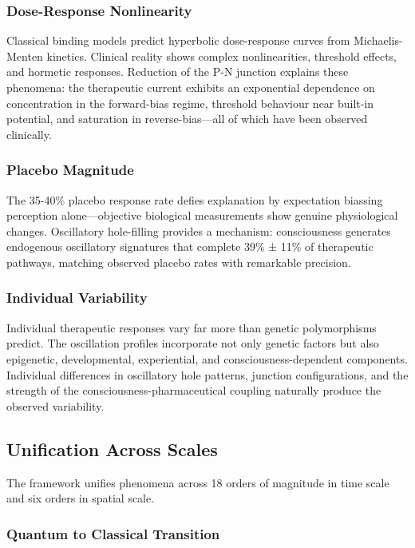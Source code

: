\documentclass{article}
\theoremstyle{definition}
\theoremstyle{remark}
\begin{document}
\subsubsection{Dose-Response Nonlinearity}

Classical binding models predict hyperbolic dose-response curves from Michaelis-Menten kinetics. Clinical reality shows complex nonlinearities, threshold effects, and hormetic responses. Reduction of the P-N junction explains these phenomena: the therapeutic current exhibits an exponential dependence on concentration in the forward-bias regime, threshold behaviour near built-in potential, and saturation in reverse-bias—all of which have been observed clinically.

\subsubsection{Placebo Magnitude}

The 35-40\% placebo response rate\cite{Benedetti2008} defies explanation by expectation biassing perception alone—objective biological measurements show genuine physiological changes. Oscillatory hole-filling provides a mechanism: consciousness generates endogenous oscillatory signatures that complete 39\% ± 11\% of therapeutic pathways, matching observed placebo rates with remarkable precision.

\subsubsection{Individual Variability}

Individual therapeutic responses vary far more than genetic polymorphisms predict. The oscillation profiles incorporate not only genetic factors but also epigenetic, developmental, experiential, and consciousness-dependent components. Individual differences in oscillatory hole patterns, junction configurations, and the strength of the consciousness-pharmaceutical coupling naturally produce the observed variability.

\subsection{Unification Across Scales}

The framework unifies phenomena across 18 orders of magnitude in time scale and six orders in spatial scale.

\subsubsection{Quantum to Classical Transition}
\end{document}
